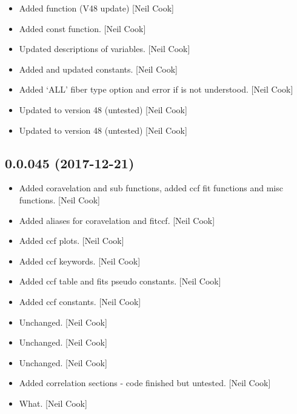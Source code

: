 \documentclass[a4paper,10pt,english]{report}
\begin{document}
\begin{itemize}
\item {} 
Added  function (V48 update) {[}Neil Cook{]}

\item {} 
Added  const function. {[}Neil Cook{]}

\item {} 
Updated descriptions of  variables. {[}Neil Cook{]}

\item {} 
Added and updated  constants. {[}Neil Cook{]}

\item {} 
Added ‘ALL’ fiber type option and error if  is not
understood. {[}Neil Cook{]}

\item {} 
Updated to version 48 (untested) {[}Neil Cook{]}

\item {} 
Updated to version 48 (untested) {[}Neil Cook{]}

\end{itemize}


\subsection{0.0.045 (2017-12-21)}
\label{\detokenize{misc/changelog:id507}}\begin{itemize}
\item {} 
Added coravelation and sub functions, added ccf fit functions and misc
functions. {[}Neil Cook{]}

\item {} 
Added aliases for coravelation and fitccf. {[}Neil Cook{]}

\item {} 
Added ccf plots. {[}Neil Cook{]}

\item {} 
Added ccf keywords. {[}Neil Cook{]}

\item {} 
Added ccf table and fits pseudo constants. {[}Neil Cook{]}

\item {} 
Added ccf constants. {[}Neil Cook{]}

\item {} 
Unchanged. {[}Neil Cook{]}

\item {} 
Unchanged. {[}Neil Cook{]}

\item {} 
Unchanged. {[}Neil Cook{]}

\item {} 
Added correlation sections - code finished but untested. {[}Neil Cook{]}

\item {} 
What. {[}Neil Cook{]}

\end{itemize}
\end{document}
